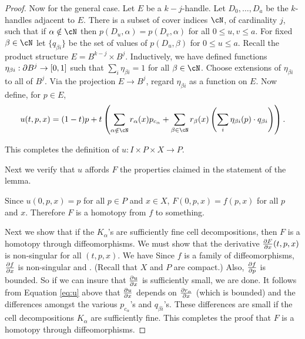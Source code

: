 \begin{proof}
Now for the general case.
Let $E$ be a $k{-}j$-handle.
Let $D_0,\ldots,D_a$ be the $k$-handles adjacent to $E$.
There is a subset of cover indices $\cN$, of cardinality $j$, 
such that if $\alpha\notin\cN$ then
$p(D_u, \alpha) = p(D_v, \alpha)$ for all $0\le u,v \le a$.
For fixed $\beta\in\cN$ let $\{q_{\beta i}\}$ be the set of values of 
$p(D_u, \beta)$ for $0\le u \le a$.
Recall the product structure $E = B^{k-j}\times B^j$.
Inductively, we have defined functions $\eta_{\beta i}:\partial B^j \to [0,1]$ such that
$\sum_i \eta_{\beta i} = 1$ for all $\beta\in \cN$.
Choose extensions of $\eta_{\beta i}$ to all of $B^j$.
Via the projection $E\to B^j$, regard $\eta_{\beta i}$ as a function on $E$.
Now define, for $p \in E$,
\begin{equation}
\label{eq:u}
    u(t, p, x) = (1-t)p + t \left(
            \sum_{\alpha \notin \cN} r_\alpha(x) p_{c_\alpha}
                + \sum_{\beta \in \cN} r_\beta(x) \left( \sum_i \eta_{\beta i}(p) \cdot q_{\beta i} \right)
             \right) .
\end{equation}

This completes the definition of $u: I \times P \times X \to P$.

\medskip

Next we verify that $u$ affords $F$ the properties claimed in the statement of the lemma.

Since $u(0, p, x) = p$ for all $p\in P$ and $x\in X$, $F(0, p, x) = f(p, x)$ for all $p$ and $x$.
Therefore $F$ is a homotopy from $f$ to something.


Next we show that if the $K_\alpha$'s are sufficiently fine cell decompositions,
then $F$ is a homotopy through diffeomorphisms.
We must show that the derivative $\frac{\partial F}{\partial x}(t, p, x)$ is non-singular for all $(t, p, x)$.
We have
Since $f$ is a family of diffeomorphisms, $\frac{\partial f}{\partial x}$ is non-singular and
.
(Recall that $X$ and $P$ are compact.)
Also, $\frac{\partial f}{\partial p}$ is bounded.
So if we can insure that $\frac{\partial u}{\partial x}$ is sufficiently small, we are done.
It follows from Equation \eqref{eq:u} above that $\frac{\partial u}{\partial x}$ depends on $\frac{\partial r_\alpha}{\partial x}$
(which is bounded)
and the differences amongst the various $p_{c_\alpha}$'s and $q_{\beta i}$'s.
These differences are small if the cell decompositions $K_\alpha$ are sufficiently fine.
This completes the proof that $F$ is a homotopy through diffeomorphisms.


\end{proof}
